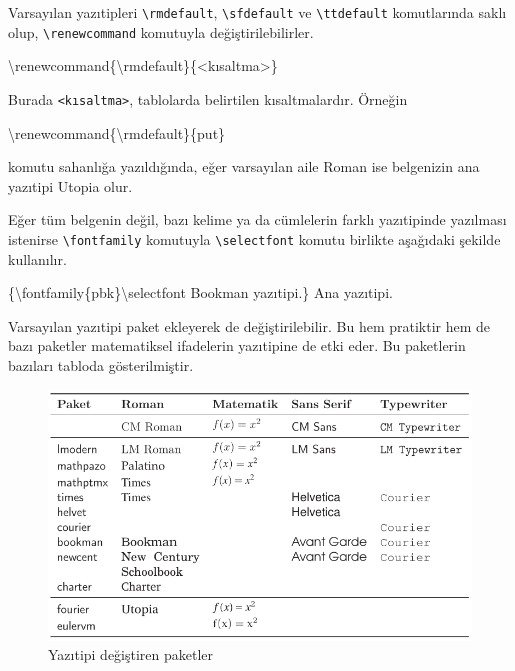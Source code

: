 \documentclass[
  10pt,
]{scrbook}
\newenvironment{Shaded}{\begin{snugshade}}{\end{snugshade}}
\newcommand{\NormalTok}[1]{#1}
\newcommand{\SpecialCharTok}[1]{\textcolor[rgb]{0.00,0.00,0.00}{#1}}
\begin{document}
Varsayılan yazıtipleri \texttt{\textbackslash{}rmdefault}, \texttt{\textbackslash{}sfdefault} ve \texttt{\textbackslash{}ttdefault}
komutlarında saklı olup, \texttt{\textbackslash{}renewcommand} komutuyla değiştirilebilirler.

\begin{Shaded}
\begin{Highlighting}[]
\NormalTok{\textbackslash{}renewcommand\{\textbackslash{}rmdefault\}\{}\SpecialCharTok{\textless{}}\NormalTok{kısaltma}\SpecialCharTok{\textgreater{}}\NormalTok{\}}
\end{Highlighting}
\end{Shaded}

Burada \texttt{\textless{}kısaltma\textgreater{}}, tablolarda belirtilen kısaltmalardır. Örneğin

\begin{Shaded}
\begin{Highlighting}[]
\NormalTok{\textbackslash{}renewcommand\{\textbackslash{}rmdefault\}\{put\}}
\end{Highlighting}
\end{Shaded}

komutu sahanlığa yazıldığında, eğer varsayılan aile Roman ise belgenizin
ana yazıtipi Utopia olur.

Eğer tüm belgenin değil, bazı kelime ya da cümlelerin farklı yazıtipinde
yazılması istenirse \texttt{\textbackslash{}fontfamily} komutuyla \texttt{\textbackslash{}selectfont} komutu
birlikte aşağıdaki şekilde kullanılır.

\begin{Shaded}
\begin{Highlighting}[]
\NormalTok{\{\textbackslash{}fontfamily\{pbk\}\textbackslash{}selectfont Bookman yazıtipi.\} Ana yazıtipi.}
\end{Highlighting}
\end{Shaded}

Varsayılan yazıtipi paket ekleyerek de değiştirilebilir. Bu hem
pratiktir hem de bazı paketler matematiksel ifadelerin yazıtipine de
etki eder. Bu paketlerin bazıları tabloda gösterilmiştir.

\begin{figure}
\centering
\includegraphics{images/yazitipi6.png}
\caption{Yazıtipi değiştiren
paketler}
\end{figure}
\end{document}
